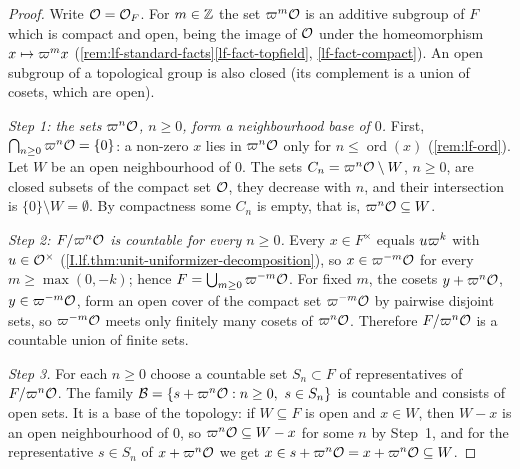 \begin{theorem}
\end{theorem}
\begin{proof}
Write $\mathcal{O}=\mathcal{O}_F$. For $m\in\mathbb{Z}$ the set $\varpi^m\mathcal{O}$ is an additive subgroup of $F$ which is compact and open,
being the image of $\mathcal{O}$ under the homeomorphism $x\mapsto\varpi^m x$
(\cref{rem:lf-standard-facts}\ref{lf-fact-topfield}, \ref{lf-fact-compact}). An open subgroup of a topological
group is also closed (its complement is a union of cosets, which are open).

\emph{Step 1: the sets $\varpi^n\mathcal{O}$, $n\ge0$, form a neighbourhood base of $0$.} First,
$\bigcap_{n\ge0}\varpi^n\mathcal{O}=\{0\}$: a non-zero $x$ lies in $\varpi^n\mathcal{O}$ only for $n\le\operatorname{ord}(x)$
(\cref{rem:lf-ord}). Let $W$ be an open neighbourhood of $0$. The sets $C_n=\varpi^n\mathcal{O}\setminus W$, $n\ge0$, are
closed subsets of the compact set $\mathcal{O}$, they decrease with $n$, and their intersection is
$\{0\}\setminus W=\emptyset$. By compactness some $C_n$ is empty, that is, $\varpi^n\mathcal{O}\subseteq W$.

\emph{Step 2: $F/\varpi^n\mathcal{O}$ is countable for every $n\ge0$.} Every $x\in F^\times$ equals $u\varpi^k$ with
$u\in\mathcal{O}^\times$ (\cref{I.lf.thm:unit-uniformizer-decomposition}), so $x\in\varpi^{-m}\mathcal{O}$ for every
$m\ge\max(0,-k)$; hence $F=\bigcup_{m\ge0}\varpi^{-m}\mathcal{O}$. For fixed $m$, the cosets $y+\varpi^n\mathcal{O}$,
$y\in\varpi^{-m}\mathcal{O}$, form an open cover of the compact set $\varpi^{-m}\mathcal{O}$ by pairwise disjoint sets, so
$\varpi^{-m}\mathcal{O}$ meets only finitely many cosets of $\varpi^n\mathcal{O}$. Therefore $F/\varpi^n\mathcal{O}$ is a countable union
of finite sets.

\emph{Step 3.} For each $n\ge0$ choose a countable set $S_n\subset F$ of representatives of $F/\varpi^n\mathcal{O}$. The
family $\mathcal B=\{s+\varpi^n\mathcal{O}:n\ge0,\ s\in S_n\}$ is countable and consists of open sets. It is a base of the
topology: if $W\subseteq F$ is open and $x\in W$, then $W-x$ is an open neighbourhood of $0$, so
$\varpi^n\mathcal{O}\subseteq W-x$ for some $n$ by Step~1, and for the representative $s\in S_n$ of $x+\varpi^n\mathcal{O}$ we get
$x\in s+\varpi^n\mathcal{O}=x+\varpi^n\mathcal{O}\subseteq W$.
\end{proof}

\begin{tfoutline}
\end{tfoutline}

